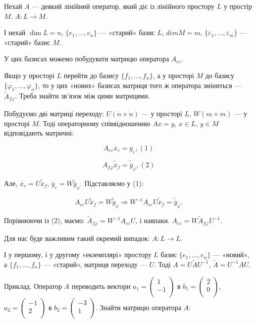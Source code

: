 Нехай $A$ --- деякий лінійний оператор, який діє із лінійного простору $L$ у
простір $M$. $A: L \rightarrow M$.

І нехай $\dim L = n$, $\{e_1, ..., e_n\}$ --- «старий» базис $L$, $dim M = m$,
$\{\varepsilon_1, ..., \varepsilon_m\}$ --- «старий» базис $M$.

У цих базисах можемо побудувати матрицю оператора $A_{e \varepsilon}$.

Якщо у просторі $L$ перейти до базису $\{f_1 ,..., f_n\}$, а у просторі $M$ до
базису $\{\varphi_1 ,..., \varphi_n\}$, то у цих «нових» базисах матриця того ж оператора
зміниться --- $\tilde{A}_{f \varphi}$. Треба знайти зв’язок між цими матрицями.

Побудуємо дві матриці переходу: $U(n \times n)$ --- у просторі $L$, $W (m \times m)$ --- у
просторі $M$. Тоді операторному співвідношенню $A x = y$, $x \in L$, $y \in M$
відповідають матричні:

$$A_{e \varepsilon} \overline{x}_{e} = \overline{y}_{\varepsilon}, (1)$$

$$A_{f \varphi} \tilde{\overline{x}}_{f} = \tilde{\overline{y}}_{\varphi}, (2)$$

Але, $\overline{x}_{e} = U \tilde{\overline{x}}_f$,
$\overline{y}_{\varepsilon} = W \tilde{\overline{y}}_{\varphi}$. Підставляємо у (1):

$$A_{e \varepsilon} U \tilde{\overline{x}}_f = W \tilde{\overline{y}}_{\varphi} 
\Rightarrow W^{-1} A_{e \varepsilon} U \tilde{\overline{x}}_f = \tilde{\overline{y}}_{\varphi}.$$

Порівнюючи із (2), маємо: $\tilde{A}_{f \varphi} = W^{-1} A_{e \varepsilon} U$,
і навпаки. $A_{e \varepsilon} = W \tilde{A}_{f \varphi} U^{-1}$.

Для нас буде важливим такий окремий випадок: $A: L \rightarrow L$.

І у першому, і у другому «екземплярі» простору $L$ базис $\{e_1 ,..., e_n\}$ ---
«новий», а $\{f_1 ,..., f_n\}$ --- «старий», матриця переходу --- $U$.
Тоді $A = U \tilde{A} U^{-1}$, $\tilde{A} = U^{-1} A U$.

Приклад. Оператор $A$ переводить вектори $a_1 = \begin{pmatrix} 1 \\ -1 \\ \end{pmatrix}$ в 
$b_1 = \begin{pmatrix} 2 \\ 0 \\ \end{pmatrix}$, $a_2 = \begin{pmatrix} -1 \\ 2 \\ \end{pmatrix}$
в $b_2 = \begin{pmatrix} -3 \\ 1 \\ \end{pmatrix}$. Знайти матрицю оператора $A$:

